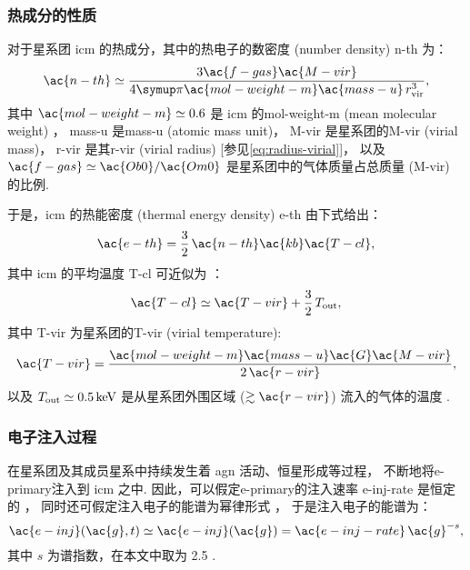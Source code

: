 \subsubsection{热成分的性质}

对于星系团 \ac{icm} 的热成分，其中的热电子的数密度 (number density) \ac{n-th} 为：
\begin{equation}
  \label{eq:n-th}
  \ac{n-th} \simeq
    \frac{3 \ac{f-gas} \ac{M-vir}}{
      4\Cpi \ac{mol-weight-m} \ac{mass-u} \,r^3_{\R{vir}}} ,
\end{equation}
其中
$\ac{mol-weight-m} \simeq 0.6$ 是 \ac{icm} 的\acl{mol-weight-m}
(mean molecular weight) \cite{ettori2013}，
\ac{mass-u} 是\acl{mass-u} (atomic mass unit)，
\ac{M-vir} 是星系团的\acl{M-vir} (virial mass)，
\ac{r-vir} 是其\acl{r-vir} (virial radius)
[参见\autoref{eq:radius-virial}]，
以及 $\ac{f-gas} \simeq \ac{Ob0}/\ac{Om0}$
是星系团中的气体质量占总质量 (\ac{M-vir}) 的比例.

于是，\ac{icm} 的热能密度 (thermal energy density) \ac{e-th} 由下式给出：
\begin{equation}
  \label{eq:e-th}
  \ac{e-th} = \frac{3}{2} \,\ac{n-th} \ac{kb} \ac{T-cl} ,
\end{equation}
其中 \ac{icm} 的平均温度 \ac{T-cl} 可近似为 \cite{cavaliere1998}：
\begin{equation}
  \label{eq:t-icm}
  \ac{T-cl} \simeq \ac{T-vir} + \frac{3}{2} \,T_{\R{out}} ,
\end{equation}
其中 \ac{T-vir} 为星系团的\acl{T-vir} (virial temperature):
\begin{equation}
  \ac{T-vir} =
    \frac{\ac{mol-weight-m} \ac{mass-u} \ac{G} \ac{M-vir}}{2\,\ac{r-vir}} ,
\end{equation}
以及 $T_{\R{out}} \simeq \SI{0.5}{\keV}$
是从星系团外围区域 ($\gtrsim \ac{r-vir}$) 流入的气体的温度 \cite{fujita2003}.

\subsubsection{电子注入过程}

在星系团及其成员星系中持续发生着 \ac{agn} 活动、恒星形成等过程，
不断地将\ac{e-primary}注入到 \ac{icm} 之中.
因此，可以假定\ac{e-primary}的注入速率 \ac{e-inj-rate} 是恒定的
\cite{cassano2005,donnert2014}，
同时还可假定注入电子的能谱为幂律形式 \cite{sarazin1999}，
于是注入电子的能谱为：
\begin{equation}
  \label{eq:electron-inj}
  \ac{e-inj}(\ac{g}, t)
    \simeq \ac{e-inj}(\ac{g})
    = \ac{e-inj-rate} \,\ac{g}^{-s} ,
\end{equation}
其中 $s$ 为谱指数，在本文中取为 2.5 \cite{cassano2005}.

